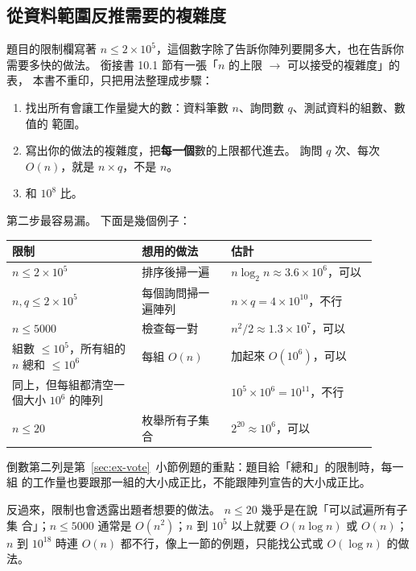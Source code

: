 \subsection{從資料範圍反推需要的複雜度}
\label{sec:from-limits}

題目的限制欄寫著 $n \le 2 \times 10^5$，這個數字除了告訴你陣列要開多大，也在告訴你
需要多快的做法。 銜接書 10.1 節有一張「$n$ 的上限 $\to$ 可以接受的複雜度」的表，
本書不重印，只把用法整理成步驟：

\begin{enumerate}
\item 找出所有會讓工作量變大的數：資料筆數 $n$、詢問數 $q$、測試資料的組數、數值的
範圍。
\item 寫出你的做法的複雜度，把\textbf{每一個}數的上限都代進去。 詢問 $q$ 次、每次
$O(n)$，就是 $n \times q$，不是 $n$。
\item 和 $10^8$ 比。
\end{enumerate}

第二步最容易漏。 下面是幾個例子：

\begin{center}
\begin{tabular}{p{0.32\linewidth}p{0.22\linewidth}p{0.36\linewidth}}
\toprule
限制 & 想用的做法 & 估計 \\
\midrule
$n \le 2 \times 10^5$ & 排序後掃一遍 & $n \log_2 n \approx 3.6 \times 10^6$，可以 \\
$n, q \le 2 \times 10^5$ & 每個詢問掃一遍陣列 & $n \times q = 4 \times 10^{10}$，不行 \\
$n \le 5000$ & 檢查每一對 & $n^2/2 \approx 1.3 \times 10^7$，可以 \\
組數 $\le 10^5$，所有組的 $n$ 總和 $\le 10^6$ & 每組 $O(n)$ & 加起來 $O(10^6)$，可以 \\
同上，但每組都清空一個大小 $10^6$ 的陣列 & & $10^5 \times 10^6 = 10^{11}$，不行 \\
$n \le 20$ & 枚舉所有子集合 & $2^{20} \approx 10^6$，可以 \\
\bottomrule
\end{tabular}
\end{center}

倒數第二列是第~\ref{sec:ex-vote}~小節例題的重點：題目給「總和」的限制時，每一組
的工作量也要跟那一組的大小成正比，不能跟陣列宣告的大小成正比。

反過來，限制也會透露出題者想要的做法。 $n \le 20$ 幾乎是在說「可以試遍所有子集
合」；$n \le 5000$ 通常是 $O(n^2)$；$n$ 到 $10^5$ 以上就要 $O(n \log n)$ 或 $O(n)$；
$n$ 到 $10^{18}$ 時連 $O(n)$ 都不行，像上一節的例題，只能找公式或 $O(\log n)$ 的做法。

